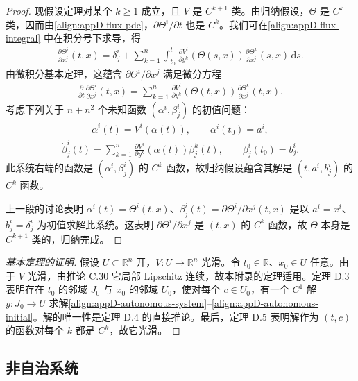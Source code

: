 \documentclass[../../main.tex]{subfiles}
\begin{document}
\begin{proof}
现假设定理对某个 $k\geqslant1$ 成立，且 $V$ 是 $C^{k+1}$ 类。由归纳假设，$\Theta$ 是 $C^k$ 类，因而由\eqref{align:appD-flux-pde}，$\partial\Theta^i/\partial t$ 也是 $C^k$。我们可在\eqref{align:appD-flux-integral} 中在积分号下求导，得
\begin{align*}
\frac{\partial\Theta^i}{\partial x^j}(t,x)=\delta^i_j+\sum_{k=1}^n\int_{t_0}^t\frac{\partial V^i}{\partial y^k}(\Theta(s,x))\frac{\partial\Theta^k}{\partial x^j}(s,x)\,\mathrm{d}s.
\end{align*}
由微积分基本定理，这蕴含 $\partial\Theta^i/\partial x^j$ 满足微分方程
\begin{align*}
\frac{\partial}{\partial t}\frac{\partial\Theta^i}{\partial x^j}(t,x)
=\sum_{k=1}^n\frac{\partial V^i}{\partial y^k}(\Theta(t,x))\frac{\partial\Theta^k}{\partial x^j}(t,x).
\end{align*}
考虑下列关于 $n+n^2$ 个未知函数 $(\alpha^i,\beta^i_j)$ 的初值问题：
\begin{align*}
\dot\alpha^i(t)=V^i(\alpha(t)),\qquad \alpha^i(t_0)=a^i,
\end{align*}
\begin{align*}
\dot\beta^i_j(t)=\sum_{k=1}^n\frac{\partial V^i}{\partial y^k}(\alpha(t))\beta^k_j(t),\qquad \beta^i_j(t_0)=b^i_j.
\end{align*}
此系统右端的函数是 $(\alpha^i,\beta^i_j)$ 的 $C^k$ 函数，故归纳假设蕴含其解是 $(t,a^i,b^i_j)$ 的 $C^k$ 函数。

上一段的讨论表明 $\alpha^i(t)=\Theta^i(t,x)$、$\beta^i_j(t)=\partial\Theta^i/\partial x^j(t,x)$ 是以 $a^i=x^i$、$b^i_j=\delta^i_j$ 为初值求解此系统。这表明 $\partial\Theta^i/\partial x^j$ 是 $(t,x)$ 的 $C^k$ 函数，故 $\Theta$ 本身是 $C^{k+1}$ 类的，归纳完成。
\end{proof}

\begin{proof}[基本定理的证明]
假设 $U\subset\mathbb R^n$ 开，$V:U\to\mathbb R^n$ 光滑。令 $t_0\in\mathbb R$、$x_0\in U$ 任意。由于 $V$ 光滑，由推论 C.30 它局部 Lipschitz 连续，故本附录的定理适用。定理 D.3 表明存在 $t_0$ 的邻域 $J_0$ 与 $x_0$ 的邻域 $U_0$，使对每个 $c\in U_0$，有一个 $C^1$ 解 $y:J_0\to U$ 求解\eqref{align:appD-autonomous-system}--\eqref{align:appD-autonomous-initial}。解的唯一性是定理 D.4 的直接推论。最后，定理 D.5 表明解作为 $(t,c)$ 的函数对每个 $k$ 都是 $C^k$，故它光滑。
\end{proof}

\subsection*{非自治系统}
\end{document}
